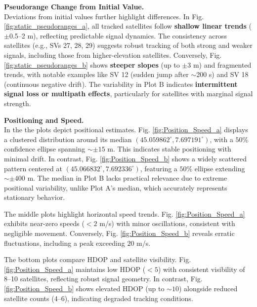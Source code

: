         \vspace{0.5em}
        \noindent\textbf{Pseudorange Change from Initial Value.} 
        \\Deviations from initial values further highlight differences. In Fig. \ref{fig:static_pseudoranges_a}, all tracked satellites follow \textbf{shallow linear trends} ($\pm$0.5--2 m), reflecting predictable signal dynamics. The consistency across satellites (e.g., SVs 27, 28, 29) suggests robust tracking of both strong and weaker signals, including those from higher-elevation satellites. Conversely, Fig. \ref{fig:static_pseudoranges_b} shows \textbf{steeper slopes} (up to $\pm$3 m) and fragmented trends, with notable examples like SV 12 (sudden jump after $\sim$200 s) and SV 18 (continuous negative drift). The variability in Plot B indicates \textbf{intermittent signal loss or multipath effects}, particularly for satellites with marginal signal strength. 

    
        \vspace{0.5em}
        \noindent\textbf{Positioning and Speed.} 
        \\In the  the plots depict positional estimates. Fig. \ref{fig:Position_Speed_a} displays a clustered distribution around its median $(45.059862^\circ, 7.697191^\circ)$, with a $50\%$ confidence ellipse spanning $\sim \pm 15$ m. This indicates stable positioning with minimal drift. In contrast, Fig. \ref{fig:Position_Speed_b} shows a widely scattered pattern centered at $(45.066832^\circ, 7.692336^\circ)$, featuring a $50\%$ ellipse extending $\sim \pm 400$ m. The median in Plot B lacks practical relevance due to extreme positional variability, unlike Plot A’s median, which accurately represents stationary behavior.  

        The middle plots highlight horizontal speed trends. Fig. \ref{fig:Position_Speed_a} exhibits near-zero speeds ($<2$ m/s) with minor oscillations, consistent with negligible movement. Conversely, Fig. \ref{fig:Position_Speed_b} reveals erratic fluctuations, including a peak exceeding $20$ m/s.

        The bottom plots compare HDOP and satellite visibility. Fig. \ref{fig:Position_Speed_a} maintains low HDOP ($<5$) with consistent visibility of 8–10 satellites, reflecting robust signal geometry. In contrast, Fig. \ref{fig:Position_Speed_b} shows elevated HDOP (up to $\sim 10$) alongside reduced satellite counts (4–6), indicating degraded tracking conditions.

